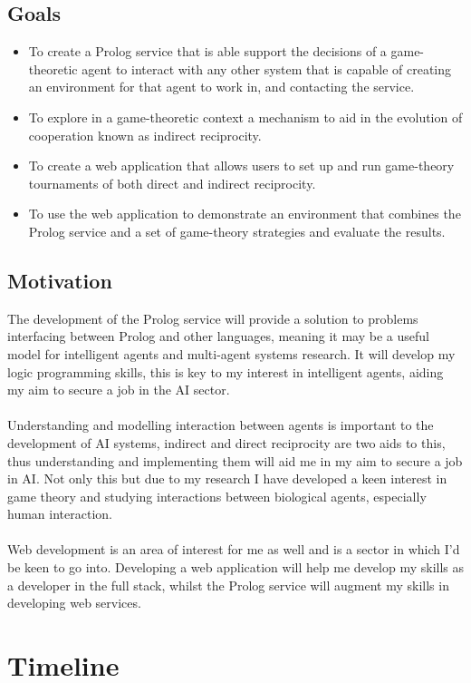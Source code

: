 \documentclass{article}
\begin{document}
\subsection*{Goals}
\begin{itemize}
\item To create a Prolog service that is able support the decisions of a game-theoretic agent to interact with any other system that is capable of creating an environment for that agent to work in, and contacting the service.
\item To explore in a game-theoretic context a mechanism to aid in the evolution of cooperation known as indirect reciprocity.
\item To create a web application that allows users to set up and run game-theory tournaments of both direct and indirect reciprocity.
\item To use the web application to demonstrate an environment that combines the Prolog service and a set of game-theory strategies and evaluate the results.
\end{itemize}

\subsection*{Motivation}
The development of the Prolog service will provide a solution to problems interfacing between Prolog and other languages, meaning it may be a useful model for intelligent agents and multi-agent systems research. It will develop my logic programming skills, this is key to my interest in intelligent agents, aiding my aim to secure a job in the AI sector.\\\\
Understanding and modelling interaction between agents is important to the development of AI systems, indirect and direct reciprocity are two aids to this, thus understanding and implementing them will aid me in my aim to secure a job in AI. Not only this but due to my research I have developed a keen interest in game theory and studying interactions between biological agents, especially human interaction.\\\\
Web development is an area of interest for me as well and is a sector in which I'd be keen to go into. Developing a web application will help me develop my skills as a developer in the full stack, whilst the Prolog service will augment my skills in developing web services.

\section*{Timeline}
\end{document}

